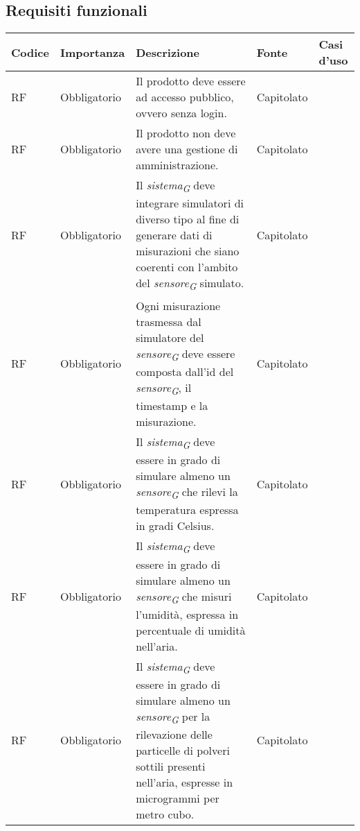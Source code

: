 \subsection{Requisiti funzionali}

\begin{longtable}{|C{1.5cm}|C{2cm}|L{5cm}|C{2cm}|C{1.5cm}|}
    \hline
    \textbf{Codice} & \textbf{Importanza} & \textbf{Descrizione} & \textbf{Fonte}  & \textbf{Casi d'uso} \\
    
    \hline
    RF & Obbligatorio & Il prodotto deve essere ad accesso pubblico, ovvero senza login.& Capitolato & \\
    
    \hline
     RF & Obbligatorio & Il prodotto non deve avere una gestione di amministrazione.& Capitolato & \\
    
    \hline
     RF & Obbligatorio & Il \textit{sistema}\textsubscript{\textit{G}} deve integrare simulatori di diverso tipo al fine di generare dati di misurazioni che siano coerenti con l'ambito del \textit{sensore}\textsubscript{\textit{G}} simulato.& Capitolato & \\
    
    \hline
     RF & Obbligatorio & Ogni misurazione trasmessa dal simulatore del \textit{sensore}\textsubscript{\textit{G}} deve essere composta dall'id del \textit{sensore}\textsubscript{\textit{G}}, il timestamp e la misurazione.& Capitolato & \\
    
    \hline
     RF & Obbligatorio &  Il \textit{sistema}\textsubscript{\textit{G}} deve essere in grado di simulare almeno un \textit{sensore}\textsubscript{\textit{G}} che rilevi la temperatura espressa in gradi Celsius.& Capitolato &  \\
    
    \hline
     RF & Obbligatorio &  Il \textit{sistema}\textsubscript{\textit{G}} deve essere in grado di simulare almeno un \textit{sensore}\textsubscript{\textit{G}} che misuri l'umidità, espressa in percentuale di umidità nell'aria.& Capitolato &  \\
    
    \hline
     RF & Obbligatorio &  Il \textit{sistema}\textsubscript{\textit{G}} deve essere in grado di simulare almeno un \textit{sensore}\textsubscript{\textit{G}} per la rilevazione delle particelle di polveri sottili presenti nell'aria, espresse in microgrammi per metro cubo.& Capitolato & \\
    

\end{longtable}
